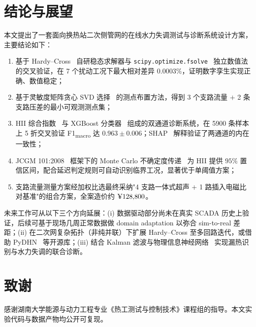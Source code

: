 \documentclass[11pt,a4paper]{ctexart}
\begin{document}
\section{结论与展望}\label{sec:conc}
本文提出了一套面向换热站二次侧管网的在线水力失调测试与诊断系统设计方案，主要结论如下：
\begin{enumerate}[leftmargin=*,itemsep=2pt,topsep=3pt]
    \item 基于 Hardy--Cross~\cite{cross1936} 自研稳态求解器与 \texttt{scipy.optimize.fsolve}~\cite{virtanen2020scipy} 独立数值法的交叉验证，在 7 个扰动工况下最大相对差异 $0.0003\%$，证明数字孪生实现正确、数值稳定；
    \item 基于灵敏度矩阵贪心 SVD 选择~\cite{nelson2000sensor} 的测点布置方法，得到 3 个支路流量 $+$ 2 条支路压差的最小可观测测点集；
    \item HII 综合指数~\cite{che2023} 与 XGBoost 分类器~\cite{chen2016xgboost} 组成的双通道诊断系统，在 5900 条样本上 5 折交叉验证 F1\textsubscript{macro} 达 $0.963\pm 0.006$；SHAP~\cite{lundberg2017shap} 解释验证了两通道的内在一致性；
    \item JCGM 101:2008~\cite{gum101} 框架下的 Monte Carlo 不确定度传递~\cite{henrion1997} 为 HII 提供 $95\%$ 置信区间，配合延迟判定规则可自动识别临界工况，显著优于单阈值方案；
    \item 支路流量测量方案经加权比选最终采纳"4 支路一体式超声 $+$ 1 路插入电磁比对基准"的组合方案，全案造价约 $\text{\textyen}128{,}800$。
\end{enumerate}

未来工作可从以下三个方向延展：(i) 数据驱动部分尚未在真实 SCADA 历史上验证，后续可基于现场几周正常数据做 domain adaptation 以弥合 sim-to-real 差距；(ii) 在二次网复杂拓扑（非纯并联）下扩展 Hardy--Cross 至多回路迭代，或借助 PyDHN~\cite{pydhn} 等开源库；(iii) 结合 Kalman 滤波与物理信息神经网络~\cite{shi2025} 实现漏热识别与水力失调的联合诊断。

\section*{致谢}
感谢湖南大学能源与动力工程专业《热工测试与控制技术》课程组的指导。本文实验代码与数据产物均公开可复现。
\end{document}
